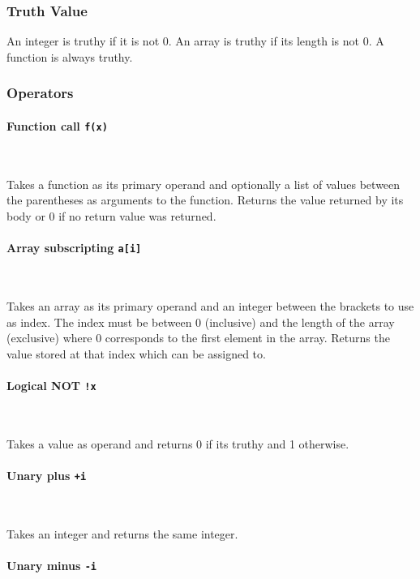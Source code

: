 \documentclass[12pt, a4paper]{article}
\begin{document}
\subsubsection{Truth Value}

An integer is truthy if it is not 0. An array is truthy if its length is not 0. A function is always truthy.

\subsubsection{Operators}

\paragraph{Function call \quad \texttt{f(x)}} \

Takes a function as its primary operand and optionally a list of values between the parentheses as arguments to the function. Returns the value returned by its body or 0 if no return value was returned.

\paragraph{Array subscripting \quad \texttt{a[i]}} \

Takes an array as its primary operand and an integer between the brackets to use as index. The index must be between 0 (inclusive) and the length of the array (exclusive) where 0 corresponds to the first element in the array. Returns the value stored at that index which can be assigned to.


\paragraph{Logical NOT \quad \texttt{!x}} \

Takes a value as operand and returns 0 if its truthy and 1 otherwise.

\paragraph{Unary plus \quad \texttt{+i}} \

Takes an integer and returns the same integer.

\paragraph{Unary minus \quad \texttt{-i}} \
\end{document}
